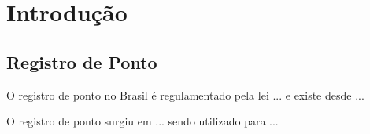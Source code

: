 \documentclass[12pt,openright,twoside,a4paper,english, brazil]{abntex2} %
\begin{document}
\listoffigures*
\cleardoublepage %
\listoftables* %
\cleardoublepage
\printterms[columns=1,style=align] %
\cleardoublepage %
\tableofcontents








\chapter{Introdução}

\section{Registro de Ponto}

O registro de ponto no Brasil é regulamentado pela lei ... e existe desde ...

O registro de ponto surgiu em ... sendo utilizado para ...








\end{document}
